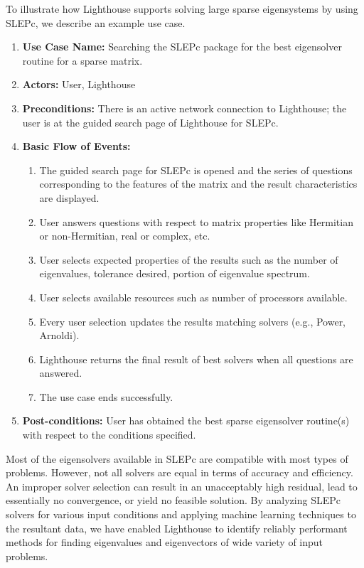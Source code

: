 \documentclass{sig-alternate}
\newcommand{\zapspace}{\topsep=0pt\partopsep=0pt\itemsep=0pt\parskip=0pt}
\begin{document}
To illustrate how Lighthouse supports solving large sparse eigensystems by using SLEPc, we describe an example use case.
\begin{enumerate}\zapspace
\item \textbf{Use Case Name:} Searching the SLEPc package for the best eigensolver routine for a sparse matrix.
\item \textbf{Actors:} User, Lighthouse
\item \textbf{Preconditions:} There is an active network connection to Lighthouse; the user is at the guided search page of Lighthouse for SLEPc.
\item \textbf{Basic Flow of Events:}
    \begin{enumerate}
        \item The guided search page for SLEPc is opened and the series of questions corresponding to the features of the matrix and the result characteristics are displayed.
        \item User answers questions with respect to matrix properties like Hermitian or non-Hermitian, real or complex, etc.
        \item User selects expected properties of the results such as the number of eigenvalues, tolerance desired, portion of eigenvalue spectrum.
	\item User selects available resources such as number of processors available.
        \item Every user selection updates the results matching solvers (e.g., Power, Arnoldi).
        \item Lighthouse returns the final result of best solvers when all questions are answered.
        \item The use case ends successfully.
     \end{enumerate}
\item \textbf{Post-conditions:} User has obtained the best sparse eigensolver routine(s) with respect to the conditions specified.
\end{enumerate}

Most of the eigensolvers available in SLEPc are compatible with most types of problems. However, not all
solvers are equal in terms of accuracy and efficiency. An improper solver selection can result in an unacceptably 
high residual, lead to
essentially no convergence, or yield no feasible solution. By analyzing SLEPc solvers for various input conditions and applying
machine learning techniques to the resultant data, we have enabled Lighthouse to identify reliably performant methods
for finding eigenvalues and eigenvectors of wide variety of input problems.
\end{document}

